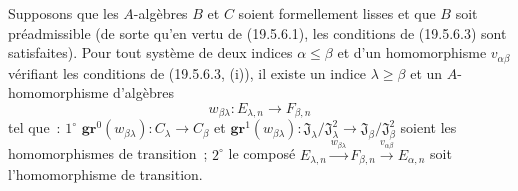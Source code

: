 \begin{lemma}[19.5.6.5]
\label{0.19.5.6.5-fr}
Supposons que les $A$-algèbres $B$ et $C$ soient formellement lisses et que
$B$ soit préadmissible (de sorte qu'en vertu de \textup{(19.5.6.1)}, les conditions de
\textup{(19.5.6.3)} sont satisfaites). Pour tout système de deux indices
$\alpha\leq\beta$ et d'un homomorphisme $v_{\alpha\beta}$ vérifiant les
conditions de \textup{(19.5.6.3, (i))}, il existe un indice $\lambda\geq\beta$ et un
$A$-homomorphisme d'algèbres
\[
  w_{\beta\lambda}:E_{\lambda,n}\longrightarrow F_{\beta,n}
\]
tel que~: $1^\circ$ $\mathbf{gr}^0(w_{\beta\lambda}):C_\lambda\to C_\beta$ et
$\mathbf{gr}^1(w_{\beta\lambda}):
\mathfrak J_\lambda/\mathfrak J_\lambda^2\to
\mathfrak J_\beta/\mathfrak J_\beta^2$ soient les homomorphismes de
transition~; $2^\circ$ le composé
$E_{\lambda,n}\xrightarrow{w_{\beta\lambda}}F_{\beta,n}
\xrightarrow{v_{\alpha\beta}}E_{\alpha,n}$ soit l'homomorphisme de transition.
\end{lemma}

